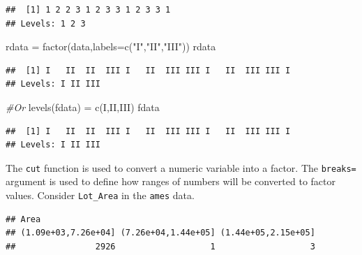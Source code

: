 \documentclass[
]{book}
\newenvironment{Shaded}{\begin{snugshade}}{\end{snugshade}}
\newcommand{\AttributeTok}[1]{\textcolor[rgb]{0.77,0.63,0.00}{#1}}
\newcommand{\CommentTok}[1]{\textcolor[rgb]{0.56,0.35,0.01}{\textit{#1}}}
\newcommand{\DecValTok}[1]{\textcolor[rgb]{0.00,0.00,0.81}{#1}}
\newcommand{\FunctionTok}[1]{\textcolor[rgb]{0.00,0.00,0.00}{#1}}
\newcommand{\NormalTok}[1]{#1}
\newcommand{\OtherTok}[1]{\textcolor[rgb]{0.56,0.35,0.01}{#1}}
\newcommand{\SpecialCharTok}[1]{\textcolor[rgb]{0.00,0.00,0.00}{#1}}
\newcommand{\StringTok}[1]{\textcolor[rgb]{0.31,0.60,0.02}{#1}}
\begin{document}
\begin{verbatim}
##  [1] 1 2 2 3 1 2 3 3 1 2 3 3 1
## Levels: 1 2 3
\end{verbatim}

\begin{Shaded}
\begin{Highlighting}[]
\NormalTok{rdata }\OtherTok{=} \FunctionTok{factor}\NormalTok{(data,}\AttributeTok{labels=}\FunctionTok{c}\NormalTok{(}\StringTok{"I"}\NormalTok{,}\StringTok{"II"}\NormalTok{,}\StringTok{"III"}\NormalTok{))}
\NormalTok{rdata}
\end{Highlighting}
\end{Shaded}

\begin{verbatim}
##  [1] I   II  II  III I   II  III III I   II  III III I  
## Levels: I II III
\end{verbatim}

\begin{Shaded}
\begin{Highlighting}[]
\CommentTok{\#Or}
\FunctionTok{levels}\NormalTok{(fdata) }\OtherTok{=} \FunctionTok{c}\NormalTok{(}\StringTok{\textquotesingle{}I\textquotesingle{}}\NormalTok{,}\StringTok{\textquotesingle{}II\textquotesingle{}}\NormalTok{,}\StringTok{\textquotesingle{}III\textquotesingle{}}\NormalTok{)}
\NormalTok{fdata}
\end{Highlighting}
\end{Shaded}

\begin{verbatim}
##  [1] I   II  II  III I   II  III III I   II  III III I  
## Levels: I II III
\end{verbatim}

The \texttt{cut} function is used to convert a numeric variable into a factor. The \texttt{breaks=} argument is used to define how ranges of numbers will be converted to factor values. Consider \texttt{Lot\_Area} in the \texttt{ames} data.

\begin{Shaded}
\end{Shaded}

\begin{verbatim}
## Area
## (1.09e+03,7.26e+04] (7.26e+04,1.44e+05] (1.44e+05,2.15e+05] 
##                2926                   1                   3
\end{verbatim}
\end{document}
